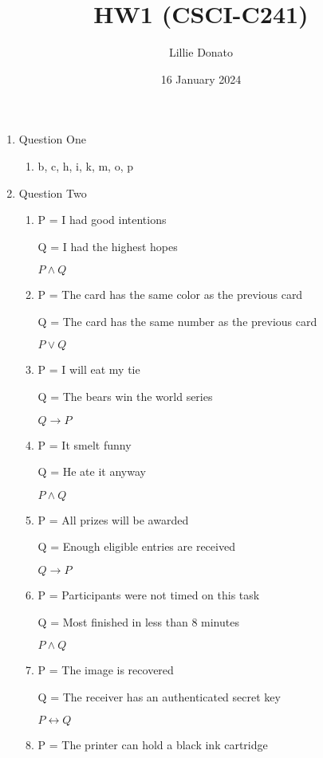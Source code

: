 \documentclass{article}
\title{HW1 (CSCI-C241)}
\author{Lillie Donato}
\date{16 January 2024}
\begin{document}
\maketitle

\begin{enumerate}
    \item Question One
    \begin{enumerate}
        \item b, c, h, i, k, m, o, p
    \end{enumerate}
    \item Question Two
    \begin{enumerate}
        \item
        P = I had good intentions
        
		Q = I had the highest hopes
        
		$P \land Q$

        \item
        P = The card has the same color as the previous card

        Q = The card has the same number as the previous card

        $P \lor Q$
        \item
        P = I will eat my tie

        Q = The bears win the world series
        
        $Q \rightarrow P$
        \item
        P = It smelt funny

        Q = He ate it anyway

        $P \land Q$
        \item
        P = All prizes will be awarded

        Q = Enough eligible entries are received

        $Q \rightarrow P$
        \item
        P = Participants were not timed on this task

        Q = Most finished in less than 8 minutes

        $P \land Q$
        \item
        P = The image is recovered

        Q = The receiver has an authenticated secret key

        $P \leftrightarrow Q$
        \item
        P = The printer can hold a black ink cartridge


\end{enumerate}
\end{enumerate}
\end{document}
